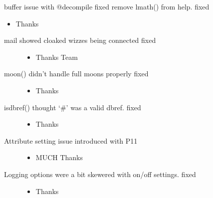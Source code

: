 \documentclass[letterpaper,10pt,english]{sphinxmanual}
\begin{document}
\sphinxAtStartPar
buffer issue with @decompile \sphinxhyphen{} fixed
remove lmath() from help. \sphinxhyphen{} fixed
\begin{itemize}
\item {} 
\sphinxAtStartPar
Thanks 

\end{itemize}
\begin{description}
\item[{mail showed cloaked wizzes being connected \sphinxhyphen{} fixed}] \leavevmode\begin{itemize}
\item {} 
\sphinxAtStartPar
Thanks  Team

\end{itemize}

\item[{moon() didn’t handle full moons properly \sphinxhyphen{} fixed}] \leavevmode\begin{itemize}
\item {} 
\sphinxAtStartPar
Thanks 

\end{itemize}

\item[{isdbref() thought ‘\#’ was a valid dbref. \sphinxhyphen{} fixed}] \leavevmode\begin{itemize}
\item {} 
\sphinxAtStartPar
Thanks 

\end{itemize}

\item[{Attribute setting issue introduced with P11}] \leavevmode\begin{itemize}
\item {} 
\sphinxAtStartPar
MUCH Thanks 

\end{itemize}

\item[{Logging options were a bit skewered with on/off settings. \sphinxhyphen{} fixed}] \leavevmode\begin{itemize}
\item {} 
\sphinxAtStartPar
Thanks 

\end{itemize}

\end{description}
\end{document}
